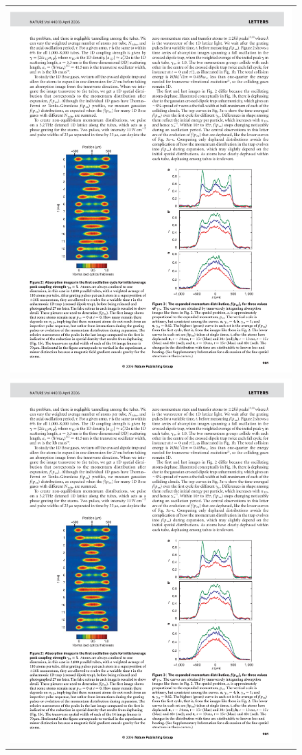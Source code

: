 \documentclass[onecolumn,amsfonts,showpacs,superscriptaddress]{revtex4-1}
\begin{document}
\begin{figure}
{\begin{tabular}{c}
    \includegraphics[viewport=325 354 533 449,clip]{figures/NewtonCradleWeiss.pdf}\\
    \includegraphics[viewport=325 156 533 176,clip]{figures/NewtonCradleWeiss.pdf}

\end{tabular}}
\end{figure}
\end{document}
